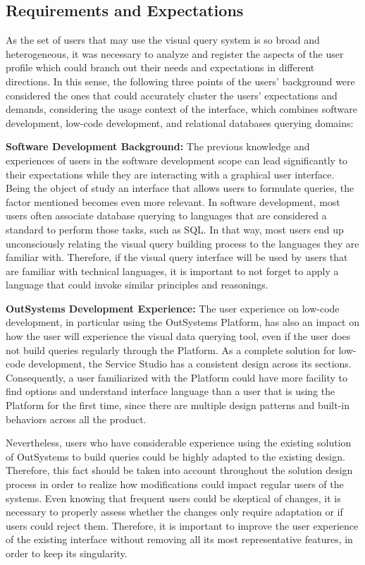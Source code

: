 \subsection{Requirements and Expectations}
\label{subsec:requirements_and_expectations}

As the set of users that may use the visual query system is so broad and heterogeneous, it was necessary to analyze and register the aspects of the user profile which could branch out their needs and expectations in different directions. In this sense, the following three points of the users' background were considered the ones that could accurately cluster the users' expectations and demands, considering the usage context of the interface, which combines software development, low-code development, and relational databases querying domains:

\medskip

\textbf{Software Development Background:} The previous knowledge and experiences of users in the software development scope can lead significantly to their expectations while they are interacting with a graphical user interface. Being the object of study an interface that allows users to formulate queries, the factor mentioned becomes even more relevant. In software development, most users often associate database querying to languages that are considered a standard to perform those tasks, such as SQL. In that way, most users end up unconsciously relating the visual query building process to the languages they are familiar with. Therefore, if the visual query interface will be used by users that are familiar with technical languages, it is important to not forget to apply a language that could invoke similar principles and reasonings.

\medskip

\textbf{OutSystems Development Experience: } The user experience on low-code development, in particular using the OutSystems Platform, has also an impact on how the user will experience the visual data querying tool, even if the user does not build queries regularly through the Platform. As a complete solution for low-code development, the Service Studio has a consistent design across its sections. Consequently, a user familiarized with the Platform could have more facility to find options and understand interface language than a user that is using the Platform for the first time, since there are multiple design patterns and built-in behaviors across all the product.

Nevertheless, users who have considerable experience using the existing solution of OutSystems to build queries could be highly adapted to the existing design. Therefore, this fact should be taken into account throughout the solution design process in order to realize how modifications could impact regular users of the systems. Even knowing that frequent users could be skeptical of changes, it is necessary to properly assess whether the changes only require adaptation or if users could reject them. Therefore, it is important to improve the user experience of the existing interface without removing all its most representative features, in order to keep its singularity.

